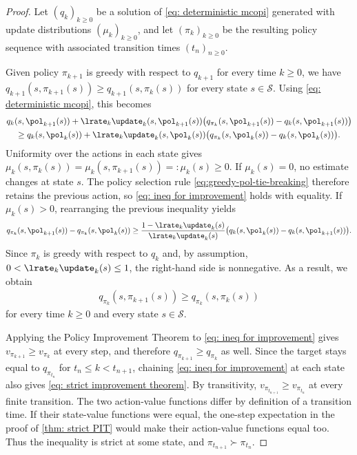 \begin{proof}
Let $(q_k)_{k \ge 0}$ be a solution of \eqref{eq: deterministic mcopi} generated with update distributions $(\mu_k)_{k \ge 0}$, and let $(\pi_k)_{k \ge 0}$ be the resulting policy sequence with associated transition times $(t_n)_{n \ge 0}$.


Given policy $\pi_{k+1}$ is greedy with respect to $q_{k+1}$ for every time $k \ge 0$, we have $q_{k+1}(s,\pi_{k+1}(s)) \ge q_{k+1}(s, \pi_k(s))$ for every state $s \in \mathcal S$.
Using \eqref{eq: deterministic mcopi}, this becomes
\begin{multline*}
    q_k(s, \pol_{k+1}(s)) + \lrate_k \update_k(s, \pol_{k+1}(s)) \big( q_{\pi_k}(s, \pol_{k+1}(s)) - q_k(s, \pol_{k+1}(s)) \big)
    \\
    \ge
    q_k(s, \pol_k(s)) + \lrate_k \update_k(s, \pol_k(s)) \big( q_{\pi_k}(s, \pol_k(s)) - q_k(s, \pol_k(s)) \big) .
\end{multline*}
Uniformity over the actions in each state gives
$\mu_k(s,\pi_k(s))=\mu_k(s,\pi_{k+1}(s))=:\mu_k(s)\ge0$.
If $\mu_k(s)=0$, no estimate changes at state $s$. The policy selection rule \eqref{eq:greedy-pol-tie-breaking} therefore retains the previous action, so \eqref{eq: ineq for improvement} holds with equality.
If $\mu_k(s)>0$, rearranging the previous inequality yields
\begin{align*}    
    q_{\pi_k}(s, \pol_{k+1}(s)) - q_{\pi_k}(s, \pol_k(s))
    \ge
    \dfrac{1 - \lrate_k \update_k(s)}{\lrate_k \update_k(s)} \big( q_k(s, \pol_k(s)) - q_k(s, \pol_{k+1}(s)) \big) .
\end{align*}
Since $\pi_k$ is greedy with respect to $q_k$ and, by assumption, $0 < \lrate_k \update_k(s) \le 1$, the right-hand side is nonnegative. As a result, we obtain
\begin{align}
\label{eq: ineq for improvement}
    q_{\pi_k}(s, \pi_{k+1}(s)) \ge q_{\pi_k}(s, \pi_k(s))
\end{align}
for every time $k \ge 0$ and every state $s \in \mathcal S$.

Applying the Policy Improvement Theorem to \eqref{eq: ineq for improvement} gives $v_{\pi_{k+1}}\ge v_{\pi_k}$ at every step, and therefore $q_{\pi_{k+1}}\ge q_{\pi_k}$ as well.
Since the target stays equal to $q_{\pi_{t_n}}$ for $t_n\le k<t_{n+1}$, chaining \eqref{eq: ineq for improvement} at each state also gives \eqref{eq: strict improvement theorem}.
By transitivity, $v_{\pi_{t_{n+1}}}\ge v_{\pi_{t_n}}$ at every finite transition. The two action-value functions differ by definition of a transition time. If their state-value functions were equal, the one-step expectation in the proof of \autoref{thm: strict PIT} would make their action-value functions equal too. Thus the inequality is strict at some state, and $\pi_{t_{n+1}}\succ\pi_{t_n}$.
\end{proof}



